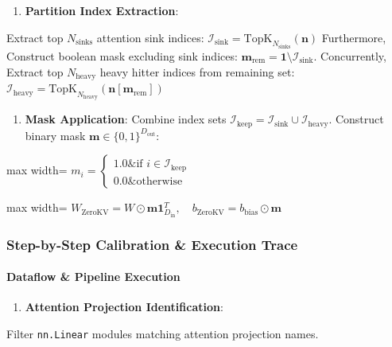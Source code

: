 \begin{enumerate}
\item \textbf{Partition Index Extraction}:
\end{enumerate}
Extract top $N_{\text{sinks}}$ attention sink indices: $\displaystyle \mathcal{I}_{\text{sink}} = \text{TopK}_{N_{\text{sinks}}}\left( \mathbf{n} \right)$ Furthermore, Construct boolean mask excluding sink indices: $\mathbf{m}_{\text{rem}} = \mathbf{1} \setminus \mathcal{I}_{\text{sink}}$. Concurrently, Extract top $N_{\text{heavy}}$ heavy hitter indices from remaining set: $\displaystyle \mathcal{I}_{\text{heavy}} = \text{TopK}_{N_{\text{heavy}}}\left( \mathbf{n}[\mathbf{m}_{\text{rem}}] \right)$


\begin{enumerate}
\item \textbf{Mask Application}:
Combine index sets $\mathcal{I}_{\text{keep}} = \mathcal{I}_{\text{sink}} \cup \mathcal{I}_{\text{heavy}}$. Construct binary mask $\mathbf{m} \in \{0, 1\}^{D_{\text{out}}}$:
\end{enumerate}
\begin{center}
\begin{adjustbox}{max width=\columnwidth}
$\displaystyle
m_i = \begin{cases} 1.0 \& \text{if } i \in \mathcal{I}_{\text{keep}} \\ 0.0 \& \text{otherwise} \end{cases}
$
\end{adjustbox}
\end{center}
\begin{center}
\begin{adjustbox}{max width=\columnwidth}
$\displaystyle
W_{\text{ZeroKV}} = W \odot \mathbf{m} \mathbf{1}_{D_{\text{in}}}^T, \quad b_{\text{ZeroKV}} = b_{\text{bias}} \odot \mathbf{m}
$
\end{adjustbox}
\end{center}


\subsubsection*{Step-by-Step Calibration \& Execution Trace}

\paragraph{Dataflow \& Pipeline Execution}

\begin{enumerate}
\item \textbf{Attention Projection Identification}:
\end{enumerate}
Filter \texttt{nn.Linear} modules matching attention projection names.

